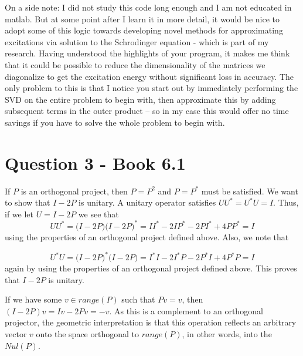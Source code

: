 \documentclass[a4paper,12pt]{article}
\begin{document}
On a side note: I did not study this code long enough and I am not educated in matlab. But at some point after I learn it in more detail, it would be nice to adopt some of this logic towards developing novel methods for approximating excitations via solution to the Schrodinger equation - which is part of my research. Having understood the highlights of your program, it makes me think that it could be possible to reduce the dimensionality of the matrices we diagonalize to get the excitation energy without significant loss in accuracy. The only problem to this is that I notice you start out by immediately performing the SVD on the entire problem to begin with, then approximate this by adding subsequent terms in the outer product -- so in my case this would offer no time savings if you have to solve the whole problem to begin with. 







\section{Question 3 - Book 6.1}

If $P$ is an orthogonal project, then $P=P^2$ and $P=P^*$ must be satisfied. We want to show that $I-2P$ is unitary. A unitary operator satisfies $UU^*=U^*U=I$. Thus, if we let $U=I-2P$ we see that
\begin{equation}
UU^* = \bigg( I-2P\bigg) \bigg( I-2P\bigg)^*= II^* -2IP^* -2PI^* +4PP^* = I
\end{equation} using the properties of an orthogonal project defined above. Also, we note that

\begin{equation}
U^*U=\bigg( I-2P\bigg)^* \bigg( I-2P\bigg)= I^*I -2I^*P-2P^*I+4P^*P = I
\end{equation} again by using the properties of an orthogonal project defined above. This proves that $I-2P$ is unitary. 



If we have some $v\in range(P)$ such that $Pv=v$, then $(I-2P)v=Iv-2Pv=-v$. As this is a complement to an orthogonal projector, the geometric interpretation is that this operation reflects an arbitrary vector $v$ onto the space orthogonal to $range(P)$, in other words, into the $Nul(P)$.
\end{document}
